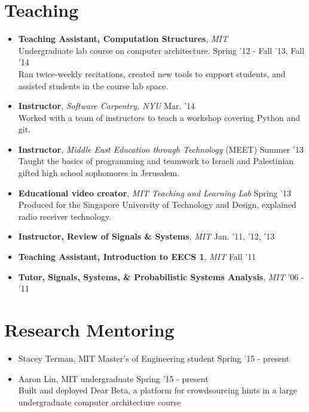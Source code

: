 \documentclass[margin]{res}
\begin{document}
\begin{resume}
\section{Teaching}
\begin{itemize}[leftmargin=*] %
\item {\bf Teaching Assistant, Computation Structures}, {\it MIT} \\Undergraduate lab course on computer architecture. \hfill Spring '12 - Fall '13, Fall '14 \\Ran twice-weekly recitations, created new tools to support students, and assisted students in the course lab space.  
\item {\bf Instructor}, {\it Software Carpentry, NYU} \hfill Mar. '14  
\\Worked with a team of instructors to teach a workshop covering Python and git.
\item {\bf Instructor}, {\it Middle East Education through Technology} (MEET) \hfill Summer '13 \\ Taught the basics of programming and teamwork to Israeli and Palestinian gifted high school sophomores in Jerusalem.
\item {\bf Educational video creator}, {\it MIT Teaching and Learning Lab} \hfill Spring '13 \\
Produced for the Singapore University of Technology and Design, explained radio receiver technology.
\item {\bf Instructor, Review of Signals \& Systems}, {\it MIT} \hfill Jan. '11, '12, '13 %
\item {\bf Teaching Assistant, Introduction to EECS 1}, {\it MIT} \hfill Fall '11 %

\item {\bf Tutor, Signals, Systems, \& Probabilistic Systems Analysis}, {\it MIT} \hfill '06 - '11 %
\end{itemize}

\section{Research Mentoring}
\begin{itemize}[leftmargin=*] 
\item Stacey Terman, MIT Master's of Engineering student \hfill Spring '15 - present
\item Aaron Lin, MIT undergraduate \hfill Spring '15 - present \\
Built and deployed Dear Beta, a platform for crowdsourcing hints in a large undergraduate computer architecture course
\end{itemize}


\end{resume}
\end{document}

